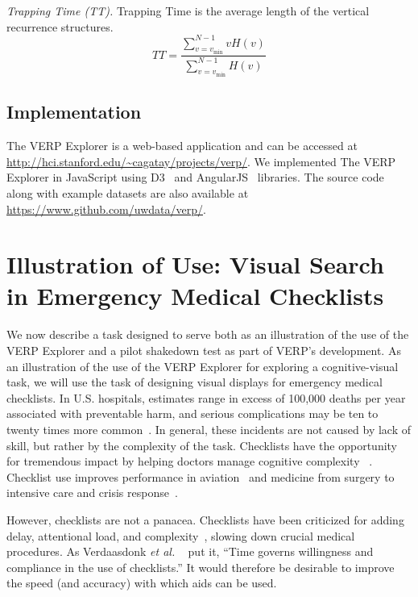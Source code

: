 \documentclass{sigchi}
\newcommand{\etal}{\textit{et al.}\xspace}
\begin{document}
\emph{Trapping Time (TT).} Trapping Time is the average length of the
vertical recurrence structures.
\[
	TT = 
	\frac{
		\sum_{v=v_{\min} }^{N-1}{vH(v)}
 	}{
		\sum_{v=v_{\min} }^{N-1}{ H(v)}
 	}
\]

\subsection{Implementation}  The VERP Explorer is a web-based application
and can be accessed at
\url{http://hci.stanford.edu/~cagatay/projects/verp/}. We implemented The
VERP Explorer in JavaScript using D3~\cite{d3_infovis11} and
AngularJS~\cite{angularweb} libraries.  The source code along with example
datasets are also available at \url{https://www.github.com/uwdata/verp/}. 



\section{Illustration of Use: Visual Search in Emergency Medical Checklists}

We now describe a task designed  to serve both as an illustration of the use of the VERP Explorer and a pilot shakedown test as part of VERP's development. As an illustration of the use of the VERP Explorer for exploring a
cognitive-visual task, we will use the task of designing visual displays
for emergency medical checklists. In U.S. hospitals, estimates range in
excess of 100,000 deaths per year associated with preventable harm, and
serious complications may be ten to twenty times more common~\cite{James_2013}. 
In general, these incidents are not caused by lack of skill, but rather by the
complexity of the task.  Checklists have the opportunity for tremendous
impact by helping doctors manage cognitive complexity ~\cite{Gawande_2009}. 
Checklist use improves performance in aviation~\cite{Boorman_2001,Degani_1990,Burian_2005} 
and medicine from  surgery to intensive care and crisis  
response~\cite{Arriaga_2013,Gawande_2009,Harrison_2006, 
Haynes_2009,Makary_2006,Pronovost_2006,Ziewacz_2011}.

However, checklists are not a panacea. Checklists have been criticized for adding
delay, attentional load, and complexity~\cite{Gawande_2009,Winters_2009}, 
slowing down crucial medical procedures. As Verdaasdonk \etal
~\cite{Verdaasdonk_2008}  put it, “Time governs
willingness and compliance in the use of checklists.” 
It would therefore be desirable to improve the speed (and accuracy) 
with which aids can be used.
\end{document}
